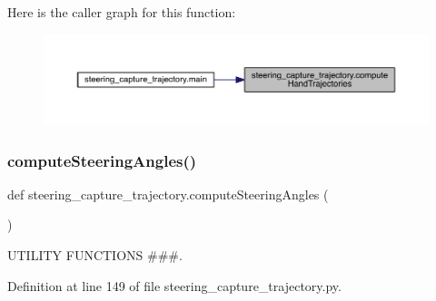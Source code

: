 Here is the caller graph for this function\+:\nopagebreak
\begin{figure}[H]
\begin{center}
\leavevmode
\includegraphics[width=350pt]{namespacesteering__capture__trajectory_a5c680d4059a6f6632b82e3f8faf773b7_icgraph}
\end{center}
\end{figure}
\mbox{\label{namespacesteering__capture__trajectory_a4b5f9adad77bffee303df87fa109e3ce}} 
\subsubsection{\texorpdfstring{computeSteeringAngles()}{computeSteeringAngles()}}
{\footnotesize\ttfamily def steering\+\_\+capture\+\_\+trajectory.\+compute\+Steering\+Angles (\begin{DoxyParamCaption}{ }\end{DoxyParamCaption})}



U\+T\+I\+L\+I\+TY F\+U\+N\+C\+T\+I\+O\+NS \#\#\#. 



Definition at line 149 of file steering\+\_\+capture\+\_\+trajectory.\+py.



